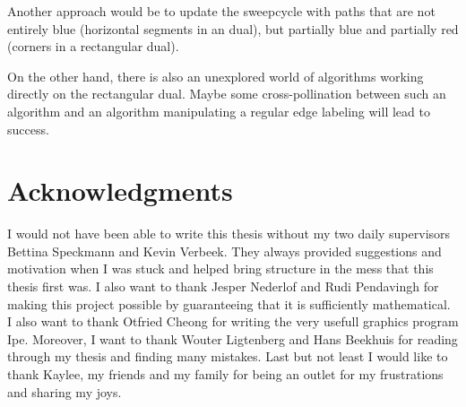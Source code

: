 Another approach would be to update the sweepcycle with paths that are not entirely blue (horizontal segments in an dual), but partially blue and partially red (corners in a rectangular dual).

On the other hand, there is also an unexplored world of algorithms working directly on the rectangular dual. Maybe some cross-pollination between such an algorithm and an algorithm manipulating a regular edge labeling will lead to success.

\newpage
\thispagestyle{plain}
\section*{Acknowledgments}
I would not have been able to write this thesis without my two daily supervisors Bettina Speckmann and Kevin Verbeek. They always provided suggestions and motivation when I was stuck and helped bring structure in the mess that this thesis first was. I also want to thank Jesper Nederlof and
Rudi Pendavingh for making this project possible by guaranteeing that it is sufficiently mathematical.
I also want to thank Otfried Cheong for writing the very usefull graphics program Ipe.
Moreover, I want to thank Wouter Ligtenberg and Hans Beekhuis for reading through my thesis and finding many mistakes. Last but not least I would like to thank Kaylee, my friends and my family for being an outlet for my frustrations and sharing my joys.
